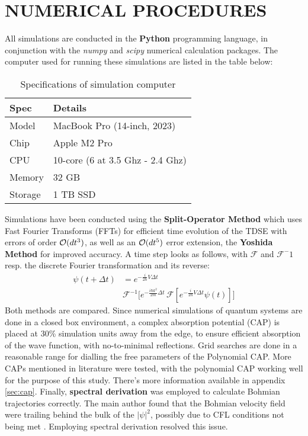 \section{NUMERICAL PROCEDURES}

All simulations are conducted in the \textbf{Python} programming language, in conjunction with the \textit{numpy} \cite{harris2020array} and \textit{scipy} \cite{2020SciPy-NMeth} numerical calculation packages. The computer used for running these simulations are listed in the table below:

\begin{table}[H]
\centering
\caption{Specifications of simulation computer}
\begin{tabular}{|l|l|}
\hline
\textbf{Spec} & \textbf{Details} \\
\hline
Model & MacBook Pro (14-inch, 2023) \\
\hline
Chip & Apple M2 Pro \\
\hline
CPU & 10-core (6 at 3.5 Ghz - 2.4 Ghz) \\
\hline
Memory & 32 GB \\
\hline
Storage & 1 TB SSD \\
\hline
\end{tabular}
\label{tab:mac_specs}
\end{table}

Simulations have been conducted using the \textbf{Split-Operator Method} which uses Fast Fourier Transforms (FFTs) for efficient time evolution of the TDSE with errors of order $\mathcal{O}(dt^3)$, as well as an $\mathcal{O}(dt^5)$ error extension, the \textbf{Yoshida Method} \cite{Yoshida1990} for improved accuracy. A time step looks as follows, with $\mathcal{F}$ and $\mathcal{F}^-1$ resp. the discrete Fourier transformation and its reverse:
\begin{align}
\psi(t+\Delta t) &=
e^{-\frac{i}{2\hbar}V\Delta t}\, \\
& \mathcal{F}^{-1}\!\bigl[e^{ -\frac{i\hbar k^2}{2m}\Delta t }\,
\mathcal{F}[e^{-\frac{i}{2\hbar}V\Delta t}\psi(t)]\bigr]
\end{align}
Both methods are compared. Since numerical simulations of quantum systems are done in a closed box environment, a complex absorption potential (CAP) is placed at 30\% simulation units away from the edge, to ensure efficient absorption of the wave function, with no-to-minimal reflections. Grid searches are done in a reasonable range for dialling the free parameters of the Polynomial CAP. More CAPs mentioned in literature were tested, with the polynomial CAP working well for the purpose of this study. There's more information available in appendix \ref{sec:cap}. Finally, \textbf{spectral derivation} was employed to calculate Bohmian trajectories correctly. The main author found that the Bohmian velocity field were trailing behind the bulk of the $|\psi|^2$, possibly due to CFL conditions not being met \cite{courant1967partial}. Employing spectral derivation resolved this issue.

